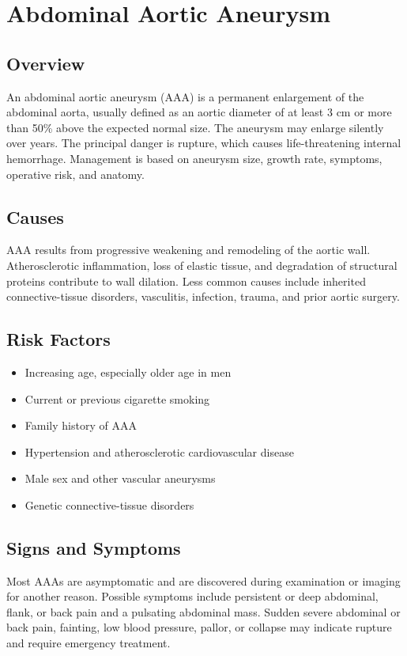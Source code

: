 \chapter{Abdominal Aortic Aneurysm}
\label{sec:Abdominal Aortic Aneurysm}

\section{Overview}
An abdominal aortic aneurysm (AAA) is a permanent enlargement of the abdominal aorta, usually defined as an aortic diameter of at least 3 cm or more than 50\% above the expected normal size. The aneurysm may enlarge silently over years. The principal danger is rupture, which causes life-threatening internal hemorrhage. Management is based on aneurysm size, growth rate, symptoms, operative risk, and anatomy.
\section{Causes}
AAA results from progressive weakening and remodeling of the aortic wall. Atherosclerotic inflammation, loss of elastic tissue, and degradation of structural proteins contribute to wall dilation. Less common causes include inherited connective-tissue disorders, vasculitis, infection, trauma, and prior aortic surgery.
\section{Risk Factors}
\begin{itemize}[noitemsep]
  \item Increasing age, especially older age in men
  \item Current or previous cigarette smoking
  \item Family history of AAA
  \item Hypertension and atherosclerotic cardiovascular disease
  \item Male sex and other vascular aneurysms
  \item Genetic connective-tissue disorders
\end{itemize}
\section{Signs and Symptoms}
Most AAAs are asymptomatic and are discovered during examination or imaging for another reason. Possible symptoms include persistent or deep abdominal, flank, or back pain and a pulsating abdominal mass. Sudden severe abdominal or back pain, fainting, low blood pressure, pallor, or collapse may indicate rupture and require emergency treatment.
